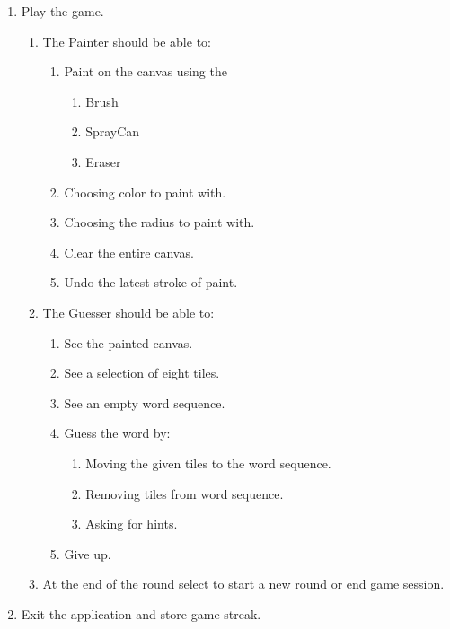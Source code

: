 \documentclass[12pt,a4paper]{scrartcl}
\begin{document}
\begin{enumerate}
    \item Play the game.
    \begin{enumerate}[label=\alph*.]
        \item The Painter should be able to:
        \begin{enumerate}[label=\alph*.]
            \item Paint on the canvas using the
                 \begin{enumerate}[label=\roman*.]
                    \item Brush
                    \item SprayCan
                    \item Eraser
                 \end{enumerate}
            \item Choosing color to paint with.
            \item Choosing the radius to paint with.
            \item Clear the entire canvas.
            \item Undo the latest stroke of paint.
        \end{enumerate}
        \item The Guesser should be able to:
        \begin{enumerate}[label=\alph*.]
            \item See the painted canvas.
            \item See a selection of eight tiles.     
            \item See an empty word sequence.
            \item Guess the word by:
                 \begin{enumerate}[label=\roman*.]
                    \item Moving the given tiles to the word sequence.
                    \item Removing tiles from word sequence.
                    \item Asking for hints.
                 \end{enumerate}
            \item Give up.
        \end{enumerate}
        \item At the end of the round select to start a new round or end game session.
    \end{enumerate}
    \item Exit the application and store game-streak.
\end{enumerate}
\end{document}
